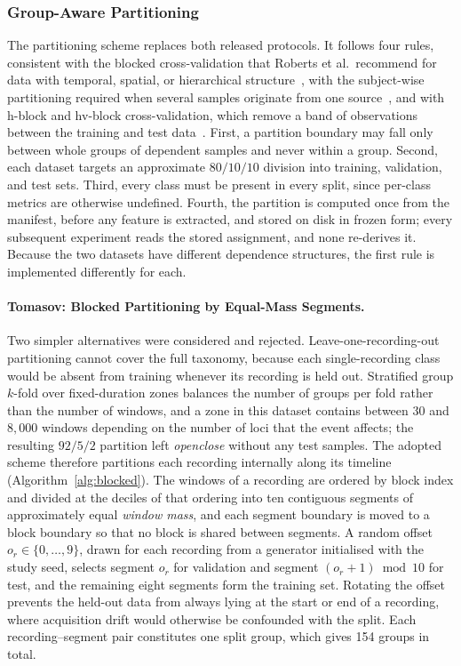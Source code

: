 \subsubsection{Group-Aware Partitioning}
\label{sec:chap3Partitioning}
The partitioning scheme replaces both released protocols. It follows four rules, consistent with the blocked cross-validation that Roberts et al.\ recommend for data with temporal, spatial, or hierarchical structure~\cite{roberts2017crossvalidation}, with the subject-wise partitioning required when several samples originate from one source~\cite{saeb2017usecase}, and with h-block and hv-block cross-validation, which remove a band of observations between the training and test data~\cite{burman1994hblock,racine2000hvblock}. First, a partition boundary may fall only between whole groups of dependent samples and never within a group. Second, each dataset targets an approximate $80/10/10$ division into training, validation, and test sets. Third, every class must be present in every split, since per-class metrics are otherwise undefined. Fourth, the partition is computed once from the manifest, before any feature is extracted, and stored on disk in frozen form; every subsequent experiment reads the stored assignment, and none re-derives it. Because the two datasets have different dependence structures, the first rule is implemented differently for each.

\paragraph[Tomasov: Blocked Partitioning by Equal-Mass Segments]{Tomasov: Blocked Partitioning by Equal-Mass Segments.}
Two simpler alternatives were considered and rejected. Leave-one-recording-out partitioning cannot cover the full taxonomy, because each single-recording class would be absent from training whenever its recording is held out. Stratified group $k$-fold over fixed-duration zones balances the number of groups per fold rather than the number of windows, and a zone in this dataset contains between 30 and $8{,}000$ windows depending on the number of loci that the event affects; the resulting $92/5/2$ partition left \emph{openclose} without any test samples. The adopted scheme therefore partitions each recording internally along its timeline (Algorithm~\ref{alg:blocked}). The windows of a recording are ordered by block index and divided at the deciles of that ordering into ten contiguous segments of approximately equal \emph{window mass}, and each segment boundary is moved to a block boundary so that no block is shared between segments. A random offset $o_r \in \{0, \dots, 9\}$, drawn for each recording from a generator initialised with the study seed, selects segment $o_r$ for validation and segment $(o_r + 1) \bmod 10$ for test, and the remaining eight segments form the training set. Rotating the offset prevents the held-out data from always lying at the start or end of a recording, where acquisition drift would otherwise be confounded with the split. Each recording--segment pair constitutes one split group, which gives 154 groups in total.


